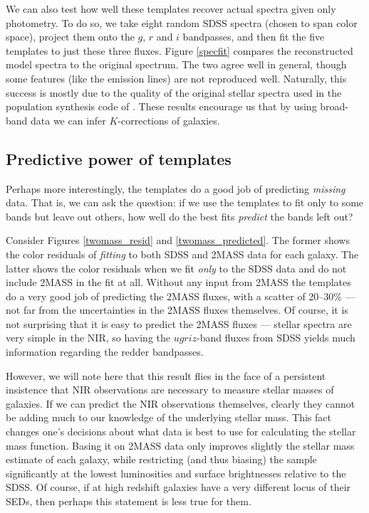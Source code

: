 \documentclass[10pt,preprint]{aastex}
\begin{document}
We can also test how well these templates recover actual spectra given
only photometry. To do so, we take eight random SDSS spectra (chosen
to span color space), project them onto the $g$, $r$ and $i$
bandpasses, and then fit the five templates to just these three
fluxes.  Figure \ref{specfit} compares the reconstructed model spectra
to the original spectrum. The two agree well in general, though some
features (like the emission lines) are not reproduced well. 
Naturally, this success is mostly due to the quality of the original
stellar spectra used in the population synthesis code of
\citet{bruzual03a}. These results encourage us that by using
broad-band data we can infer $K$-corrections of galaxies. 

\subsection{Predictive power of templates}

Perhaps more interestingly, the templates do a good job of predicting
{\it missing} data. That is, we can ask the question: if we use the
templates to fit only to some bands but leave out others, how well do
the best fits {\it predict} the bands left out?
    
Consider Figures \ref{twomass_resid} and \ref{twomass_predicted}. The
former shows the color residuals of {\it fitting} to both SDSS and
2MASS data for each galaxy. The latter shows the color residuals when
we fit {\it only} to the SDSS data and do not include 2MASS in the fit
at all. Without any input from 2MASS the templates do a very good job
of predicting the 2MASS fluxes, with a scatter of 20--30\% --- not far
from the uncertainties in the 2MASS fluxes themselves. Of course, it
is not surprising that it is easy to predict the 2MASS fluxes ---
stellar spectra are very simple in the NIR, so having the $ugriz$-band
fluxes from SDSS yields much information regarding the redder
bandpasses.

However, we will note here that this result flies in the face of a
persistent insistence that NIR observations are necessary to measure
stellar masses of galaxies. If we can predict the NIR observations
themselves, clearly they cannot be adding much to our knowledge of the
underlying stellar mass. This fact changes one's decisions about what
data is best to use for calculating the stellar mass function.  Basing
it on 2MASS data only improves slightly the stellar mass estimate of
each galaxy, while restricting (and thus biasing) the sample
significantly at the lowest luminosities and surface brightnesses
relative to the SDSS. Of course, if at high redshift galaxies have
a very different locus of their SEDs, then perhaps this statement is
less true for them.
\end{document}
